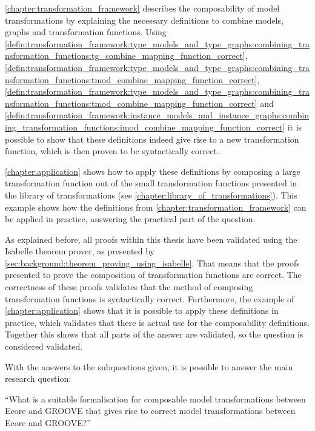 \begin{enumerate}
    \cref{chapter:transformation_framework} describes the composability of model transformations by explaining the necessary definitions to combine models, graphs and transformation functions. Using \cref{defin:transformation_framework:type_models_and_type_graphs:combining_transformation_functions:tg_combine_mapping_function_correct}, \cref{defin:transformation_framework:type_models_and_type_graphs:combining_transformation_functions:tmod_combine_mapping_function_correct}, \cref{defin:transformation_framework:type_models_and_type_graphs:combining_transformation_functions:tmod_combine_mapping_function_correct} and \cref{defin:transformation_framework:instance_models_and_instance_graphs:combining_transformation_functions:imod_combine_mapping_function_correct} it is possible to show that these definitions indeed give rise to a new transformation function, which is then proven to be syntactically correct.
    
    \cref{chapter:application} shows how to apply these definitions by composing a large transformation function out of the small transformation functions presented in the library of transformations (see \cref{chapter:library_of_transformations}). This example shows how the definitions from \cref{chapter:transformation_framework} can be applied in practice, answering the practical part of the question.
    
    As explained before, all proofs within this thesis have been validated using the Isabelle theorem prover, as presented by \cref{sec:background:theorem_proving_using_isabelle}. That means that the proofs presented to prove the composition of transformation functions are correct. The correctness of these proofs validates that the method of composing transformation functions is syntactically correct. Furthermore, the example of \cref{chapter:application} shows that it is possible to apply these definitions in practice, which validates that there is actual use for the composability definitions. Together this shows that all parts of the answer are validated, so the question is considered validated.
\end{enumerate}

With the answers to the subquestions given, it is possible to answer the main research question:

``What is a suitable formalisation for composable model transformations between Ecore and GROOVE that gives rise to correct model transformations between Ecore and GROOVE?''

